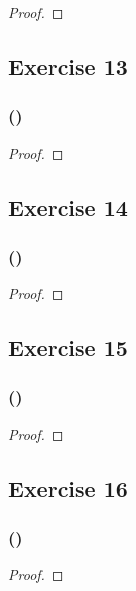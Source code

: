 \documentclass[14pt]{extarticle}
\begin{document}
\begin{proof}

\end{proof}

\subsection{Exercise 13}

\subsubsection{()}

\begin{proof}

\end{proof}

\subsection{Exercise 14}

\subsubsection{()}

\begin{proof}

\end{proof}

\subsection{Exercise 15}

\subsubsection{()}

\begin{proof}

\end{proof}

\subsection{Exercise 16}

\subsubsection{()}

\begin{proof}

\end{proof}
\end{document}
